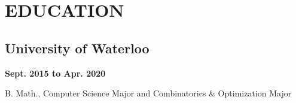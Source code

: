 \documentclass[12pt]{extarticle}
\begin{document}
\section*{EDUCATION}
\subsection*{University of Waterloo} \hfill \textbf{Sept. 2015 to Apr. 2020}

B. Math., Computer Science Major and Combinatorics \& Optimization Major
\end{document}
